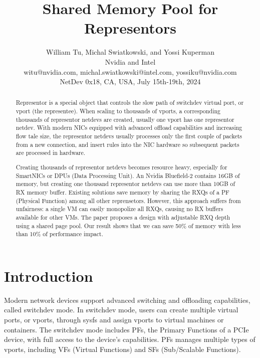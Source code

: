 \documentclass[letterpaper]{article}
\title{Shared Memory Pool for Representors}
\author{William Tu, Michal Swiatkowski, and Yossi Kuperman\\
Nvidia and Intel\\
witu@nvidia.com, michal.swiatkowski@intel.com, yossiku@nvidia.com\\
\newline
NetDev 0x18, CA, USA, July 15th-19th, 2024
\newline
}
\begin{document}
 
\maketitle

\begin{abstract}
Representor is a special object that controls the slow path of
switchdev virtual port, or vport (the representee). 
When scaling to thousands of vports, a corresponding thousands of
representor netdevs are created, usually one vport has one representor
netdev. With modern NICs equipped with advanced offload capabilities
and increasing flow tale size, the representor netdevs usually
processes only the first couple of packets
from a new connection, and insert rules into the NIC hardware so
subsequent packets are processed in hardware.

Creating thousands of representor netdevs becomes resource heavy,
especially for SmartNICs or DPUs (Data Processing Unit).
An Nvidia Bluefield-2 contains 16GB of memory, but creating one
thousand representor netdevs can use more than 10GB of RX memory buffer.
Existing solutions save memory by sharing the RXQs of a PF (Physical Function) among
all other reprensetors. However, this approach suffers from unfairness:
a single VM can easily monopolize all RXQs, causing no RX buffers
available for other VMs.
The paper proposes a design with adjustable RXQ depth using a shared page pool.
Our result shows that we can save 50\% of memory with less than 10\% of
performance impact.
\end{abstract}

\section{Introduction}
Modern network devices support advanced switching and offloading
capabilities, called switchdev mode. In switchdev mode, users can
create multiple virtual ports, or vports, through sysfs and assign
vports to virtual machines or containers. The switchdev mode includes
PFs, the Primary Functions of a PCIe device, with full access to the device's
capabilities. PFs manages multiple types of vports, including
VFs (Virtual Functions) and SFs (Sub/Scalable Functions).
\end{document}
